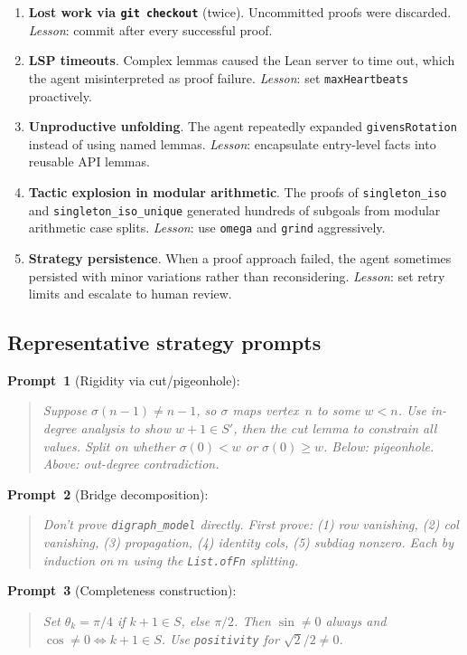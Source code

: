 \begin{humanparagraph}
\begin{enumerate}
\item \textbf{Lost work via \texttt{git checkout}} (twice). Uncommitted proofs
  were discarded. \emph{Lesson}: commit after every successful proof.

\item \textbf{LSP timeouts}. Complex lemmas caused the Lean server to time
  out, which the agent misinterpreted as proof failure.
  \emph{Lesson}: set \texttt{maxHeartbeats} proactively.

\item \textbf{Unproductive unfolding}. The agent repeatedly expanded
  \texttt{givensRotation} instead of using named lemmas.
  \emph{Lesson}: encapsulate entry-level facts into reusable API lemmas.

\item \textbf{Tactic explosion in modular arithmetic}. The proofs of
  \texttt{singleton\_iso} and \texttt{singleton\_iso\_unique} generated
  hundreds of subgoals from modular arithmetic case splits.
  \emph{Lesson}: use \texttt{omega} and \texttt{grind} aggressively.

\item \textbf{Strategy persistence}. When a proof approach failed, the agent
  sometimes persisted with minor variations rather than reconsidering.
  \emph{Lesson}: set retry limits and escalate to human review.
\end{enumerate}
\end{humanparagraph}

\subsection{Representative strategy prompts}

\begin{humanparagraph}
\noindent\textbf{Prompt~1} (Rigidity via cut/pigeonhole):
\begin{quote}\itshape
Suppose $\sigma(n{-}1) \neq n{-}1$, so $\sigma$ maps vertex~$n$ to some
$w < n$. Use in-degree analysis to show $w{+}1 \in S'$, then the cut lemma to
constrain all values. Split on whether $\sigma(0) < w$ or $\sigma(0) \ge w$.
Below: pigeonhole. Above: out-degree contradiction.
\end{quote}

\noindent\textbf{Prompt~2} (Bridge decomposition):
\begin{quote}\itshape
Don't prove \texttt{digraph\_model} directly. First prove: (1) row vanishing,
(2) col vanishing, (3) propagation, (4) identity cols, (5) subdiag nonzero.
Each by induction on $m$ using the \texttt{List.ofFn} splitting.
\end{quote}

\noindent\textbf{Prompt~3} (Completeness construction):
\begin{quote}\itshape
Set $\theta_k = \pi/4$ if $k{+}1 \in S$, else $\pi/2$.
Then $\sin \neq 0$ always and $\cos \neq 0 \iff k{+}1 \in S$.
Use \texttt{positivity} for $\sqrt{2}/2 \neq 0$.
\end{quote}
\end{humanparagraph}
